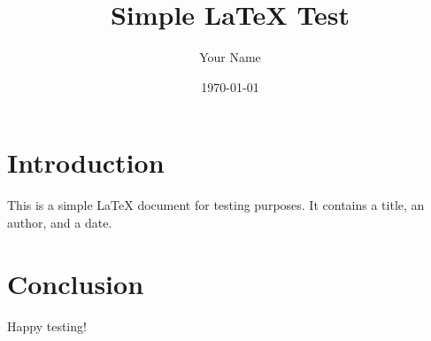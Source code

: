 \documentclass{article}
\begin{document}
\title{Simple LaTeX Test}
\author{Your Name}
\date{\today}

\maketitle

\section*{Introduction}

This is a simple LaTeX document for testing purposes.  
It contains a title, an author, and a date.

\section*{Conclusion}

Happy testing!
\end{document}
